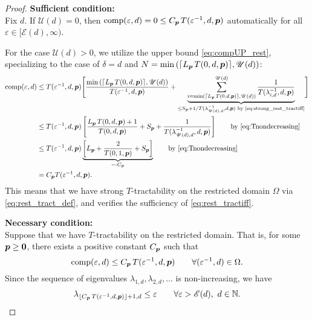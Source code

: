 \documentclass[sort&compress]{elsarticle}
\newcommand{\thed}{\delta}
\newcommand{\theM}{\mathscr{E}}
\newcommand{\theUB}{\mathscr{U}}
\newcommand{\peter}[1]{\begingroup\color{violet}#1\endgroup}
\begin{document}
\begin{proof}
    \textbf{Sufficient condition:}\\
Fix $d$.  If $\theUB(d) = 0$, then $\operatorname{comp}(\varepsilon,d) = 0 \le C_{\boldsymbol{p}}\, T(\varepsilon^{-1},d,\boldsymbol{p})$ automatically for all $\varepsilon \in [\theM(d), \infty)$.

For the case $\theUB(d)> 0$, we utilize \peter{the} upper bound \eqref{eq:compUP_rest}, specializing to the case of $\thed=d$ and $N = \min\left(\lceil L_{\vp}\, T(0,d,\vp)\rceil,\theUB(d)\right)$:
\begin{align*}
       \comp(\varepsilon,d)
       & \le T(\varepsilon^{-1},d, \vp) \Biggl [ \frac{\min\left(\lceil L_{\vp}\, T(0,d,\vp)\rceil,\theUB(d)\right)}{T(\varepsilon^{-1},d, \vp)}  + \underbrace{\sum_{i = \min\left(\lceil L_{\vp}\, T(0,d,\vp)\rceil,\theUB(d)\right)}^{\theUB(d)} \frac{1}{T(\lambda_{i, d}^{-1},d,\vp)}}_{\le S_{\vp} + 1/ T(\lambda_{\theUB(d), d}^{-1},d,\vp) \text{ by \eqref{eq:strong_rest_tractiff}} }
        \Biggr] \\
       & \le T(\varepsilon^{-1},d,\vp)\left[\frac{ L_{\vp}\, T(0,d,\vp)+1}{T(0,d, \vp)} + S_{\vp} + \frac{1}{T(\lambda_{\theUB(d), d}^{-1},d,\vp)} \right]
       \qquad \text{by \eqref{eq:Tnondecreasing}}\\
       & \le T(\varepsilon^{-1},d,\vp) \underbrace{\left[L_{\vp} + \frac{2}{T(0,1, \vp)} + S_{\vp} \right]}_{=:C_{\vp}}
       \qquad \text{by \eqref{eq:Tnondecreasing}}\\
       & =  C_{\vp}T(\varepsilon^{-1},d,\vp).
\end{align*}
This means that we have strong $T$-tractability on the restricted domain $\Omega$ via \eqref{eq:rest_tract_def}, and verifies the sufficiency of \eqref{eq:rest_tractiff}.


\bigskip

\noindent \textbf{Necessary condition:}\\
Suppose that we have
$T$-tractability on the restricted domain. That is, for some $\boldsymbol{p} \ge \boldsymbol{0}$, there exists a positive constant $C_{\boldsymbol{p}}$ such that
\[
\operatorname{comp}(\varepsilon,d)\le C_{\boldsymbol{p}}\, T(\varepsilon^{-1},d,\boldsymbol{p}) \qquad \forall (\varepsilon^{-1}, d) \in \Omega.
\]
Since the sequence of eigenvalues $\lambda_{1,d}, \lambda_{2,d}, \ldots $ is non-increasing, we have
\begin{equation}\label{eq:rest_lambda_K4}
	\lambda_{\lfloor C_{\vp}\, T(\varepsilon^{-1},d,\vp)\rfloor +1,d}\le \varepsilon \qquad 
 \forall \varepsilon > \theM(d),\ d \in \naturals.
\end{equation}


\end{proof}
\end{document}
